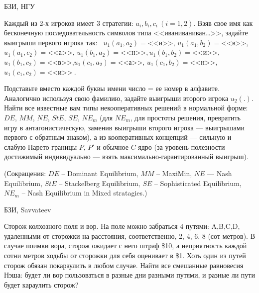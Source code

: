 \begin{problem}
\begin{source}
БЗИ, НГУ
\end{source} {\rm Каждый из
2-х игроков имеет 3 стратегии: $a_i, b_i, c_i~ (i=1,2)$.
Взяв свое имя как бесконечную последовательность символов
типа <<иваниваниван\ldots >>, задайте выигрыши первого игрока
так:~ $u_1(a_1,a_{2}) = $<<и>>, $ u_1(a_1,b_{2}) = $<<в>>,$
u_1(a_1,c_{2}) = $<<а>>, $ u_1(b_1,a_{2}) = $<<н>>$,
u_1(b_1,b_{2}) = $<<и>>, $ u_1(b_1,c_{2}) = $<<в>>,$
u_1(c_1,a_{2}) = $<<а>>, $ u_1(c_1,b_{2}) = $<<н>>,$
u_1(c_1,c_{2}) = $<<и>>$~ $.

Подставьте вместо каждой буквы имени число = ее номер в
алфавите. Аналогично используя свою фамилию, задайте
выигрыши второго игрока $u_2(.)$. Найти все известные вам
типы некооперативных решений в нормальной форме: $DE$,
$MM$, $NE$, $StE$, $SE$, $NE_m$ (для $NE_m$, для простоты
решения, превратить игру в антагонистическую, заменив
выигрыши второго игрока --- выигрышами первого с обратным
знаком), а из кооперативных концепций --- сильную и слабую
Парето-границы $P$, $P'$ и обычное $C$-ядро (за уровень
полезности достижимый индивидуально
--- взять максимально-гарантированный выигрыш).

(Сокращения: $DE$ -- Dominant Equilibrium, $MM$ -- MaxiMin,
$NE$ --- Nash Equilibrium, $StE$ -- Stackelberg Equilibrium,
$SE$ -- Sophisticated Equilibrium, $NE_m$ -- Nash
Equilibrium in Mixed stratagies.) }



\begin{sol}

\end{sol}
\end{problem}







\begin{problem}
\begin{source}
БЗИ, Savvateev
\end{source} Сторож колхозного поля и вор. На
поле можно забраться 4 путями: A,B,C,D, удаленными
от сторожки на расстояния, соответственно, 2, 4, 6,
8 (сот метров). В случае поимки вора, сторож
ожидает с него штраф \$10, а неприятность каждой
сотни метров ходьбы от сторожки для себя оценивает
в \$1. Хоть один из путей сторож обязан покараулить
в любом случае. Найти все смешанные равновесия
Нэша: будет ли  вор пользоваться в разные дни
разными путями, и разные ли пути будет караулить
сторож?






\begin{sol}

\end{sol}
\end{problem}





